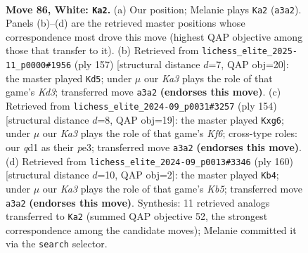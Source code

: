 \documentclass[11pt]{article}
\begin{document}
\clearpage

\begin{figure}[p]\centering
\begin{subfigure}{0.46\textwidth}\centering
\resizebox{\linewidth}{!}{%
\newchessgame
\chessboard[
  setfen={8/8/1p6/p7/2P5/K1k5/8/3q4 w - - 28 86},
  showmover=false,
  pgfstyle=straightmove, color=movearrow, markmove={a3-a2}
]}
\caption{}
\end{subfigure}\hfill
\begin{subfigure}{0.46\textwidth}\centering
\resizebox{\linewidth}{!}{%
\newchessgame
\chessboard[
  setfen={8/8/1K1k4/2p5/P7/1P6/8/8 b - - 4 79},
  showmover=false,
  pgfstyle=straightmove, color=movearrow, markmove={d6-d5}
]}
\caption{}
\end{subfigure}
\\[4pt]
\begin{subfigure}{0.46\textwidth}\centering
\resizebox{\linewidth}{!}{%
\newchessgame
\chessboard[
  setfen={8/8/5Kp1/7p/7P/4p1k1/8/8 w - - 0 78},
  showmover=false,
  pgfstyle=straightmove, color=movearrow, markmove={f6-g6}
]}
\caption{}
\end{subfigure}\hfill
\begin{subfigure}{0.46\textwidth}\centering
\resizebox{\linewidth}{!}{%
\newchessgame
\chessboard[
  setfen={8/8/6p1/1K5p/3n3P/8/6k1/2q5 w - - 4 81},
  showmover=false,
  pgfstyle=straightmove, color=movearrow, markmove={b5-b4}
]}
\caption{}
\end{subfigure}
\caption{\textbf{Move 86, White: \texttt{Ka2}.} (a) Our position; Melanie plays \texttt{Ka2} (\texttt{a3a2}). Panels (b)--(d) are the retrieved master positions whose correspondence most drove this move (highest QAP objective among those that transfer to it). (b) Retrieved from \texttt{lichess\_elite\_2025-11\_p0000\#1956} (ply 157) [structural distance $d$=7, QAP obj=20]: the master played \texttt{Kd5}; under $\mu$ our \emph{Ka3} plays the role of that game's \emph{Kd3}; transferred move \texttt{a3a2} \textbf{(endorses this move)}. (c) Retrieved from \texttt{lichess\_elite\_2024-09\_p0031\#3257} (ply 154) [structural distance $d$=8, QAP obj=19]: the master played \texttt{Kxg6}; under $\mu$ our \emph{Ka3} plays the role of that game's \emph{Kf6}; cross-type roles: our \emph{q}d1 as their \emph{p}e3; transferred move \texttt{a3a2} \textbf{(endorses this move)}. (d) Retrieved from \texttt{lichess\_elite\_2024-09\_p0013\#3346} (ply 160) [structural distance $d$=10, QAP obj=2]: the master played \texttt{Kb4}; under $\mu$ our \emph{Ka3} plays the role of that game's \emph{Kb5}; transferred move \texttt{a3a2} \textbf{(endorses this move)}. Synthesis: 11 retrieved analogs transferred to \texttt{Ka2} (summed QAP objective 52, the strongest correspondence among the candidate moves); Melanie committed it via the \texttt{search} selector.}
\label{fig:thought-m170}
\end{figure}
\end{document}
